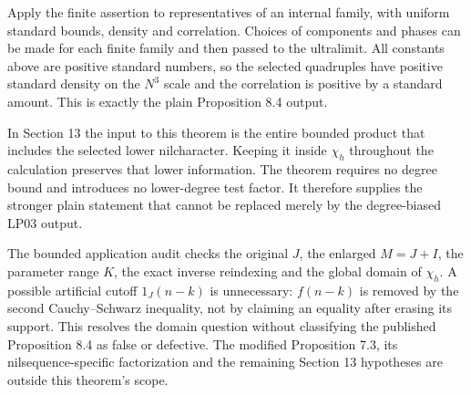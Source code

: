 \documentclass[11pt]{article}
\begin{document}
Apply the finite assertion to representatives of an internal family,
with uniform standard bounds, density and correlation. Choices of
components and phases can be made for each finite family and then
passed to the ultralimit. All constants above are positive standard
numbers, so the selected quadruples have positive standard density
on the $N^3$ scale and the correlation is positive by a standard
amount. This is exactly the plain Proposition 8.4 output.

In Section 13 the input to this theorem is the entire bounded product
that includes the selected lower nilcharacter. Keeping it inside
$\chi_h$ throughout the calculation preserves that lower information.
The theorem requires no degree bound and introduces no lower-degree
test factor. It therefore supplies the stronger plain statement that
cannot be replaced merely by the degree-biased LP03 output.

The bounded application audit checks the original $J$, the enlarged
$M=J+I$, the parameter range $K$, the exact inverse reindexing and
the global domain of $\chi_h$. A possible artificial cutoff
$1_J(n-k)$ is unnecessary: $f(n-k)$ is removed by the second
Cauchy--Schwarz inequality, not by claiming an equality after erasing
its support. This resolves the domain question without classifying
the published Proposition 8.4 as false or defective. The modified
Proposition 7.3, its nilsequence-specific factorization and the
remaining Section 13 hypotheses are outside this theorem's scope.
\end{document}
